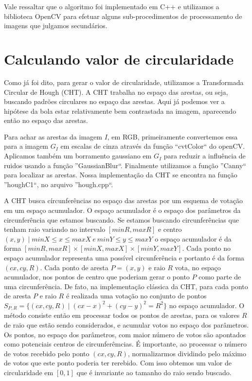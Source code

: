 \documentclass[11pt,a4paper]{article}
\begin{document}
Vale ressaltar que o algoritmo foi implementado em C++ e utilizamos a biblioteca OpenCV para efetuar alguns sub-procedimentos de processamento de imagens que julgamos secundários.

\section{Calculando valor de circularidade}

 Como já foi dito, para gerar o valor de circularidade, utilizamos a Transformada Circular de Hough (CHT). A CHT trabalha no espaço das arestas, ou seja, buscando padrões circulares no espaço das arestas. Aqui já podemos ver a hipótese da bola estar relativamente bem contrastada na imagem, aparecendo então no espaço das arestas.

 Para achar as arestas da imagem $I$, em RGB, primeiramente convertemos essa para a imagem $G_I$ em escalas de cinza através da função ``cvtColor`` do openCV. Aplicamos também um borramento gaussiano em $G_I$ para reduzir a influência de ruidos usando a função ''GaussianBlur``. Finalmente utilizamos a função ''Canny`` para localizar as arestas. Nossa implementação da CHT se encontra na função ''houghC1``, no arquivo ''hough.cpp``.

 A CHT busca círcunferências no espaço das arestas por um esquema de votação em um espaço acumulador. O espaço acumulador é o espaço dos parâmetros da circunferência que estamos buscando. Se estamos buscando circunferências que tenham raio variando no intervalo $[minR,maxR]$ e centro $(x,y) \mid minX \leq x \leq maxX ~e~ minY \leq y \leq maxY $ o espaço acumulador é da forma $[minR,maxR]\times[minX,maxX]\times[minY,maxY]$. Cada ponto no espaço acumulador representa uma possível circunferência e portanto é da forma $(cx,cy,R)$. Cada ponto de aresta $P = (x,y)$ e raio $R$ vota, no espaço acumulador, nos pontos de centro que poderiam gerar o ponto $P$ como parte de uma circunferência. De fato, na implementação clássica da CHT, para cada ponto de aresta $P$ e raio $R$ é realizada uma votação no conjunto de pontos $S_{P,R} = \{ (cx,cy,R) \mid (cx - x)^2 + (cy - y)^2 = R^2\}$ no espaço acumulador. O método consiste então em processar todos os pontos de arestas, para os valores $R$ de raio que estão sendo considerados, e acumular votos no espaço dos parâmetros. Os pontos, no espaço dos parâmetros, com maior número de votos são apontados como potenciais centros de circunferêmcias. É importante, ao processar o número de votos recebido pelo ponto $(cx,cy,R)$, normalizarmos dividindo pelo máximo de votos que este ponto poderia ter rerebido. Com isso obtemos um valor de circularidade em $[0,1]$ que é invariante ao tamanho do raio sendo buscado.
\end{document}
